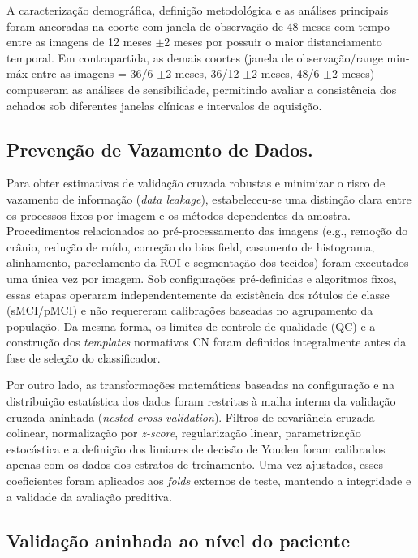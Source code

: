 \documentclass[review]{elsarticle}
\begin{document}
A caracterização demográfica, definição metodológica e as análises principais foram ancoradas na coorte com janela de observação de 48 meses com tempo entre as imagens de 12 meses $\pm$2 meses por possuir o maior distanciamento temporal. Em contrapartida, as demais coortes (janela de observação/range min-máx entre as imagens = 36/6 $\pm$2 meses, 36/12 $\pm$2 meses, 48/6 $\pm$2 meses) compuseram as análises de sensibilidade, permitindo avaliar a consistência dos achados sob diferentes janelas clínicas e intervalos de aquisição.

\subsection{Prevenção de Vazamento de Dados.}\label{subsubsec:anti-leakage} Para obter estimativas de validação cruzada robustas e minimizar o risco de vazamento de informação (\emph{data leakage}), estabeleceu-se uma distinção clara entre os processos fixos por imagem e os métodos dependentes da amostra. Procedimentos relacionados ao pré-processamento das imagens (e.g., remoção do crânio, redução de ruído, correção do bias field, casamento de histograma, alinhamento, parcelamento da ROI e segmentação dos tecidos) foram executados uma única vez por imagem. Sob configurações pré-definidas e algoritmos fixos, essas etapas operaram independentemente da existência dos rótulos de classe (sMCI/pMCI) e não requereram calibrações baseadas no agrupamento da população. Da mesma forma, os limites de controle de qualidade (QC) e a construção dos \emph{templates} normativos CN foram definidos integralmente antes da fase de seleção do classificador.

Por outro lado, as transformações matemáticas baseadas na configuração e na distribuição estatística dos dados foram restritas à malha interna da validação cruzada aninhada (\emph{nested cross-validation}). Filtros de covariância cruzada colinear, normalização por \emph{z-score}, regularização linear, parametrização estocástica e a definição dos limiares de decisão de Youden foram calibrados apenas com os dados dos estratos de treinamento. Uma vez ajustados, esses coeficientes foram aplicados aos \emph{folds} externos de teste, mantendo a integridade e a validade da avaliação preditiva.

\subsection{Validação aninhada ao nível do paciente}
\label{sec:nested_cv}
\end{document}

